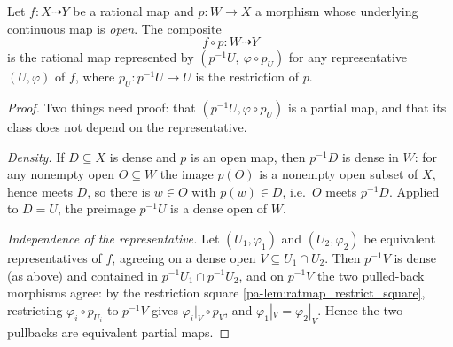 \begin{definition}
  \label{pa-def:ratmap_precomp}
  \leanok

  Let \(f : X \dashrightarrow Y\) be a rational map and \(p : W \to X\) a
  morphism whose underlying continuous map is \emph{open}. The composite
  \[
    f \circ p : W \dashrightarrow Y
  \]
  is the rational map represented by \((p^{-1}U,\ \varphi \circ p_U)\) for any
  representative \((U, \varphi)\) of \(f\), where \(p_U : p^{-1}U \to U\) is the
  restriction of \(p\).
\end{definition}
\begin{proof}
  \leanok
  Two things need proof: that \((p^{-1}U, \varphi \circ p_U)\) is a partial map,
  and that its class does not depend on the representative.

  \emph{Density.} If \(D \subseteq X\) is dense and \(p\) is an open map, then
  \(p^{-1}D\) is dense in \(W\): for any nonempty open \(O \subseteq W\) the
  image \(p(O)\) is a nonempty open subset of \(X\), hence meets \(D\), so there
  is \(w \in O\) with \(p(w) \in D\), i.e.\ \(O\) meets \(p^{-1}D\). Applied to
  \(D = U\), the preimage \(p^{-1}U\) is a dense open of \(W\).

  \emph{Independence of the representative.} Let \((U_1, \varphi_1)\) and
  \((U_2, \varphi_2)\) be equivalent representatives of \(f\), agreeing on a
  dense open \(V \subseteq U_1 \cap U_2\). Then \(p^{-1}V\) is dense (as above)
  and contained in \(p^{-1}U_1 \cap p^{-1}U_2\), and on \(p^{-1}V\) the two
  pulled-back morphisms agree: by the restriction square
  \ref{pa-lem:ratmap_restrict_square}, restricting \(\varphi_i \circ p_{U_i}\) to
  \(p^{-1}V\) gives \(\varphi_i|_V \circ p_V\), and \(\varphi_1|_V =
  \varphi_2|_V\). Hence the two pullbacks are equivalent partial maps.
\end{proof}

